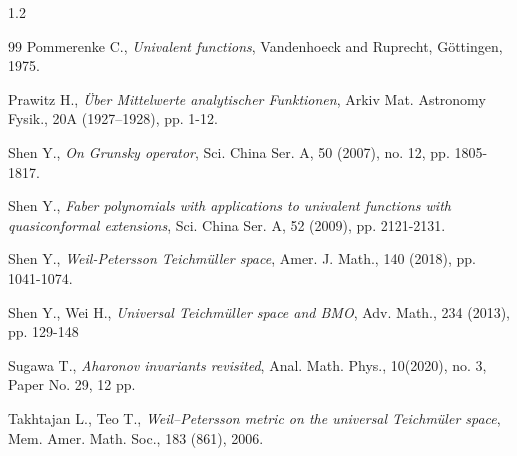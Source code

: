 \documentclass[10pt]{amsart}
\theoremstyle{definition}
\theoremstyle{remark}
\numberwithin{equation}{section}
\begin{document}
\begin{spacing}{1.2}
\begin{thebibliography}{99}
Pommerenke C., {\em Univalent functions}, Vandenhoeck and Ruprecht, G\"ottingen, 1975.


Prawitz H., {\em \"Uber Mittelwerte analytischer Funktionen}, Arkiv Mat. Astronomy Fysik., 20A (1927–1928), pp. 1-12.

Shen Y., {\em On Grunsky operator}, Sci. China Ser.  A,  50 (2007), no. 12, pp. 1805-1817.

Shen Y., {\em Faber polynomials with applications to univalent functions with quasiconformal extensions}, Sci. China
Ser. A,  52 (2009), pp. 2121-2131.

Shen Y., {\em Weil-Petersson Teichmüller space},  Amer. J. Math., 140 (2018),  pp. 1041-1074.

Shen Y.,  Wei H., {\em Universal Teichmüller space and BMO},  Adv. Math.,  234 (2013), pp. 129-148

Sugawa T., {\em Aharonov invariants revisited}, Anal. Math. Phys., 10(2020), no. 3, Paper No. 29, 12 pp.


Takhtajan L., Teo T., {\em Weil–Petersson metric on the universal Teichm\"uler space}, Mem. Amer. Math. Soc., 183 (861), 2006.


\end{thebibliography}
\end{spacing}
\end{document}

